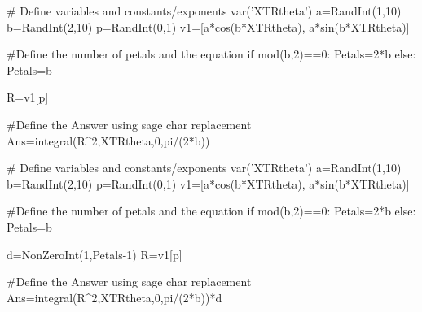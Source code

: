 \begin{sagesilent}
# Define variables and constants/exponents
var('XTRtheta')
a=RandInt(1,10)
b=RandInt(2,10)
p=RandInt(0,1)
v1=[a*cos(b*XTRtheta), a*sin(b*XTRtheta)]

#Define the number of petals and the equation
if mod(b,2)==0:
   Petals=2*b
else:
   Petals=b

R=v1[p]

#Define the Answer using sage char replacement
Ans=integral(R^2,XTRtheta,0,pi/(2*b))
\end{sagesilent}


\begin{sagesilent}
# Define variables and constants/exponents
var('XTRtheta')
a=RandInt(1,10)
b=RandInt(2,10)
p=RandInt(0,1)
v1=[a*cos(b*XTRtheta), a*sin(b*XTRtheta)]

#Define the number of petals and the equation
if mod(b,2)==0:
   Petals=2*b
else:
   Petals=b
   
d=NonZeroInt(1,Petals-1)
R=v1[p]

#Define the Answer using sage char replacement
Ans=integral(R^2,XTRtheta,0,pi/(2*b))*d
\end{sagesilent}


